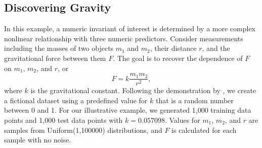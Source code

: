 \documentclass[ijds,nonblindrev]{informs-ijds}
\begin{document}
\subsection{Discovering Gravity}
\label{gravity}
In this example, a numeric invariant of interest is determined by a more complex nonlinear relationship with three numeric predictors.   Consider measurements including the masses of two objects $m_1$ and $m_2$, their distance $r$, and the gravitational force between them $F$.  The goal is to recover the dependence of $F$ on $m_1$, $m_2$, and $r$, or
\[
F = k \frac{m_1m_2}{r^2},
\]
where $k$ is the gravitational constant.  Following the demonstration by \citet{LangEtal87}, we create a fictional dataset using a predefined value for $k$ that is a random number between 0 and 1.  For our illustrative example, we generated 1,000 training data points and 1,000 test data points with $k=0.057098$.  Values for $m_1$, $m_2$, and $r$ are samples from Uniform(1,100000) distributions, and $F$ is calculated for each sample with no noise.





\end{document}
